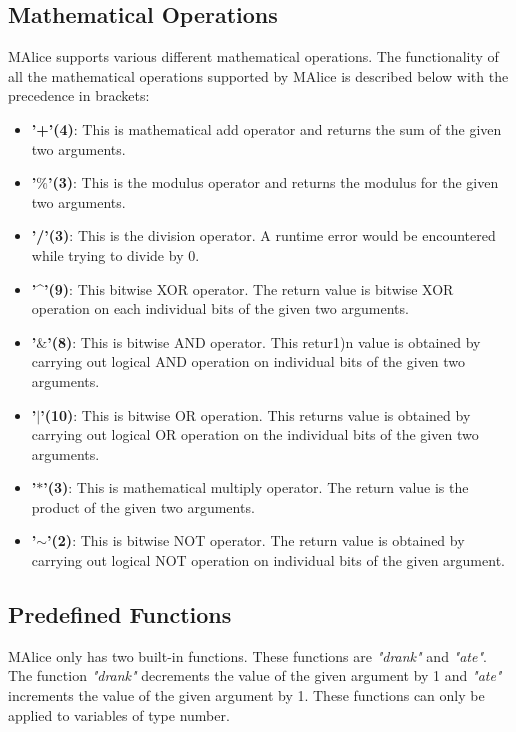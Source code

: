 \documentclass[a4wide, 11pt]{article}
\begin{document}
	\subsection{Mathematical Operations}
	\label{sec:mathOper}
		MAlice supports various different mathematical operations. The functionality of all the mathematical
		operations supported by MAlice is described below with the precedence in brackets:
		\begin{itemize}
			\item {\bf '+'(4)}: This is mathematical add operator and returns the sum of the given two arguments.
			\item {\bf '$\%$'(3)}: This is the modulus operator and returns the modulus for the given two arguments.
			\item {\bf '/'(3)}: This is the division operator. A runtime error would be encountered while trying to
				divide by 0.
			\item {\bf '\^{ }'(9)}: This bitwise XOR operator. The return value is bitwise XOR operation on each
				individual bits of the given two arguments.
			\item {\bf '$\&$'(8)}: This is bitwise AND operator. This retur1)n value is obtained by carrying out 
				logical AND operation on individual bits of the given two arguments.
			\item {\bf '$\mid$'(10)}: This is bitwise OR operation. This returns value is obtained by carrying out 
				logical OR operation on the individual bits of the given two arguments.
			\item {\bf '$\ast$'(3)}: This is mathematical multiply operator. The return value is the product of the
				given two arguments.
			\item {\bf '$\mathtt{\sim}$'(2)}: This is bitwise NOT operator. The return value is obtained by carrying
				out logical NOT operation on individual bits of the given argument.
		\end{itemize}
 
	\subsection{Predefined Functions}
	\label{sec:preFunc}
		MAlice only has two built-in functions. These functions are \emph{"drank"} and \emph{"ate"}. The function
		\emph{"drank"} decrements the value of the given argument by 1 and \emph{"ate"} increments the value of the
		given argument by 1. These functions can only be applied to variables of type number.
\end{document}
